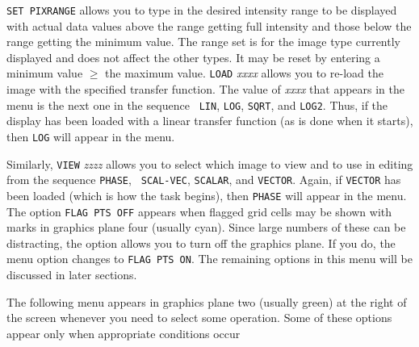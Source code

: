 \documentclass[twoside]{article}
\begin{document}
{\tt SET PIXRANGE} allows you to type in the desired intensity range
to be displayed with actual data values above the range getting full
intensity and those below the range getting the minimum value.  The
range set is for the image type currently displayed and does not
affect the other types.  It may be reset by entering a minimum value
$\geq$ the maximum value.  {\tt LOAD} {\it xxxx} allows you to re-load
the image with the specified transfer function.  The value of {\it
  xxxx} that appears in the menu is the next one in the sequence {\tt
  LIN}, {\tt LOG}, {\tt SQRT}, and {\tt LOG2}\@.  Thus, if the display
has been loaded with a linear transfer function (as is done when it
starts), then {\tt LOG} will appear in the menu.

Similarly, {\tt VIEW} {\it zzzz} allows you to select which image to
view and to use in editing from the sequence {\tt PHASE}, {\tt
  SCAL-VEC}, {\tt SCALAR}, and {\tt VECTOR}\@.  Again, if {\tt VECTOR}
has been loaded (which is how the task begins), then {\tt PHASE} will
appear in the menu.  The option {\tt FLAG PTS OFF} appears when
flagged grid cells may be shown with marks in graphics plane four
(usually cyan).  Since large numbers of these can be distracting, the
option allows you to turn off the graphics plane.  If you do, the menu
option changes to {\tt FLAG PTS ON}\@.  The remaining options in this
menu will be discussed in later sections.


The following menu appears in graphics plane two (usually green) at
the right of the screen whenever you need to select some operation.
Some of these options appear only when appropriate conditions occur
\end{document}

